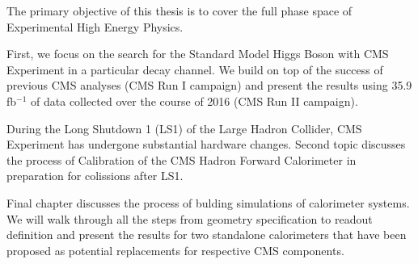 The primary objective of this thesis is to cover the full phase space of Experimental High Energy Physics.

First, we focus on the search for the Standard Model Higgs Boson with CMS Experiment in a particular decay channel. We build on top of the success of previous CMS analyses (CMS Run I campaign) and present the results using 35.9 fb$^{-1}$ of data collected over the course of 2016 (CMS Run II campaign).

During the Long Shutdown 1 (LS1) of the Large Hadron Collider, CMS Experiment has undergone substantial hardware changes. Second topic discusses the process of Calibration of the CMS Hadron Forward Calorimeter in preparation for colissions after LS1.

Final chapter discusses the process of bulding simulations of calorimeter systems. We will walk through all the steps from geometry specification to readout definition and present the results for two standalone calorimeters that have been proposed as potential replacements for respective CMS components.
